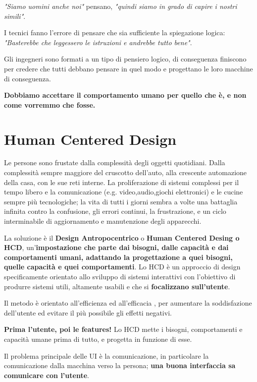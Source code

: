 \documentclass[a4paper,11pt,oneside]{book}
\begin{document}
\textit{"Siamo uomini anche noi"} pensano, \textit{"quindi siamo in grado di capire i nostri simili"}.

I tecnici fanno l'errore di pensare che sia sufficiente la spiegazione logica: \textit{"Basterebbe che leggessero le istruzioni e andrebbe tutto bene"}.

Gli ingegneri sono formati a un tipo di pensiero logico, di conseguenza finiscono per credere che tutti debbano pensare in quel modo e progettano le loro macchine di conseguenza.

\begin{center}
	\textbf{\LARGE Dobbiamo accettare il comportamento umano per quello che è, e non come vorremmo che fosse.}
\end{center}

\pagebreak


\chapter{Human Centered Design}
Le persone sono frustate dalla complessità degli oggetti quotidiani. Dalla complessità sempre maggiore del cruscotto dell'auto, alla crescente automazione della casa, con le sue reti interne. La proliferazione di sistemi complessi per il tempo libero e la comunicazione (e.g. video,audio,giochi elettronici) e le cucine sempre più tecnologiche; la vita di tutti i giorni sembra a volte una battaglia infinita contro la confusione, gli errori continui, la frustrazione, e un ciclo interminabile di aggiornamento e manutenzione degli apparecchi.

La soluzione è il \textbf{Design Antropocentrico} o \textbf{Human Centered Desing o HCD}, un'\textbf{impostazione che parte dai bisogni, dalle capacità e dai comportamenti umani, adattando la progettazione a quei bisogni, quelle capacità e quei comportamenti}. Lo HCD è un approccio di design specificamente orientato allo sviluppo di sistemi interattivi con l'obiettivo di produrre sistemi utili, altamente usabili e che si \textbf{focalizzano sull'utente}.

Il metodo è orientato all'efficienza ed all'efficacia , per aumentare la soddisfazione dell'utente ed evitare il più possibile gli effetti negativi.

\textbf{Prima l'utente, poi le features!} Lo HCD mette i bisogni, comportamenti e capacità umane prima di tutto, e progetta in funzione di esse.

Il problema principale delle UI è la comunicazione, in particolare la comunicazione dalla macchina verso la persona; \textbf{una buona interfaccia sa comunicare con l'utente}.
\end{document}
